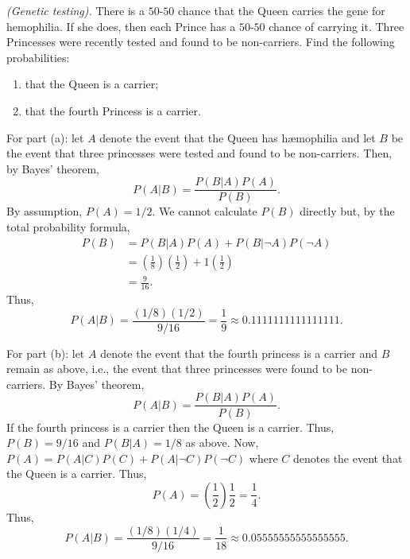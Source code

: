 \begin{problem}[Handout 5, \# 2]
  \emph{(Genetic testing).} There is a \(50\)-\(50\) chance that the Queen
  carries the gene for hemophilia. If she does, then each Prince has a
  \(50\)-\(50\) chance of carrying it. Three Princesses were recently
  tested and found to be non-carriers. Find the following probabilities:
  \begin{enumerate}[label=(\alph*),noitemsep]
  \item that the Queen is a carrier;
  \item that the fourth Princess is a carrier.
  \end{enumerate}
\end{problem}
\begin{solution}
  For part (a): let \(A\) denote the event that the Queen has hæmophilia
  and let \(B\) be the event that three princesses were tested and found to
  be non-carriers. Then, by Bayes' theorem,
  \[
    P(A|B)=\frac{P(B|A)P(A)}{P(B)}.
  \]
  By assumption, \(P(A)=1/2\). We cannot calculate \(P(B)\) directly
  but, by the total probability formula,
  \begin{align*}
    P(B)&=P(B|A)P(A)+P(B|\lnot A)P(\lnot A)\\
        &=\left(\frac{1}{8}\right)\left(\frac{1}{2}\right)
          +1\left(\frac{1}{2}\right)\\
        &=\frac{9}{16}.
  \end{align*}
  Thus,
  \[
    P(A|B)=\frac{(1/8)(1/2)}{9/16}=\frac{1}{9}\approx\num{0.1111111111111111}.
  \]

  For part (b): let \(A\) denote the event that the fourth princess is a
  carrier and \(B\) remain as above, i.e., the event that three princesses
  were found to be non-carriers. By Bayes' theorem,
  \[
    P(A|B)=\frac{P(B|A)P(A)}{P(B)}.
  \]
  If the fourth princess is a carrier then the Queen is a carrier. Thus,
  \(P(B)=9/16\) and \(P(B|A)=1/8\) as above. Now,
  \(P(A)=P(A|C)P(C)+P(A|\lnot C)P(\lnot C)\) where \(C\) denotes the event
  that the Queen is a carrier. Thus,
  \[
    P(A)=\left(\frac{1}{2}\right)\frac{1}{2}=\frac{1}{4}.
  \]
  Thus,
  \[
    P(A|B)=\frac{(1/8)(1/4)}{9/16}=\frac{1}{18}\approx\num{0.05555555555555555}.
  \]
\end{solution}
\newpage

